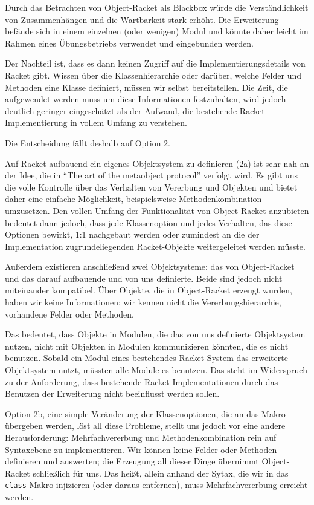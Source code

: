 Durch das Betrachten von Object-Racket als Blackbox würde die Verständlichkeit von Zusammenhängen und die Wartbarkeit stark erhöht. Die Erweiterung befände sich in einem einzelnen (oder wenigen) Modul und könnte daher leicht im Rahmen eines Übungsbetriebs verwendet und eingebunden werden.

Der Nachteil ist, dass es dann keinen Zugriff auf die Implementierungsdetails von Racket gibt. Wissen über die Klassenhierarchie oder darüber, welche Felder und Methoden eine Klasse definiert, müssen wir selbst bereitstellen. Die Zeit, die aufgewendet werden muss um diese Informationen festzuhalten, wird jedoch deutlich geringer eingeschätzt als der Aufwand, die bestehende Racket-Implementierung in vollem Umfang zu verstehen. 

Die Entscheidung fällt deshalb auf Option 2.

Auf Racket aufbauend ein eigenes Objektsystem zu definieren (2a) ist sehr nah an der Idee, die in ``The art of the metaobject protocol'' \cite{amop} verfolgt wird. Es gibt uns die volle Kontrolle über das Verhalten von Vererbung und Objekten und bietet daher eine einfache Möglichkeit, beispielsweise Methodenkombination umzusetzen. Den vollen Umfang der Funktionalität von Object-Racket anzubieten bedeutet dann jedoch, dass jede Klassenoption und jedes Verhalten, das diese Optionen bewirkt, 1:1 nachgebaut werden oder zumindest an die der Implementation zugrundeliegenden Racket-Objekte weitergeleitet werden müsste.

Außerdem existieren anschließend zwei Objektsysteme: das von Object-Racket und das darauf aufbauende und von uns definierte. Beide sind jedoch nicht miteinander kompatibel. Über Objekte, die in Object-Racket erzeugt wurden, haben wir keine Informationen; wir kennen nicht die Vererbungshierarchie, vorhandene Felder oder Methoden. 

Das bedeutet, dass Objekte in Modulen, die das von uns definierte Objektsystem nutzen, nicht mit Objekten in Modulen kommunizieren könnten, die es nicht benutzen. Sobald ein Modul eines bestehendes Racket-System das erweiterte Objektsystem nutzt, müssten alle Module es benutzen. Das steht im Widerspruch zu der Anforderung, dass bestehende Racket-Implementationen durch das Benutzen der Erweiterung nicht beeinflusst werden sollen.

Option 2b, eine simple Veränderung der Klassenoptionen, die an das Makro übergeben werden, löst all diese Probleme, stellt uns jedoch vor eine andere Herausforderung: Mehrfachvererbung und Methodenkombination rein auf Syntaxebene zu implementieren. Wir können keine Felder oder Methoden definieren und auswerten; die Erzeugung all dieser Dinge übernimmt Object-Racket schließlich für uns. Das heißt, allein anhand der Sytax, die wir in das \texttt{class}-Makro injizieren (oder daraus entfernen), muss Mehrfachvererbung erreicht werden.

